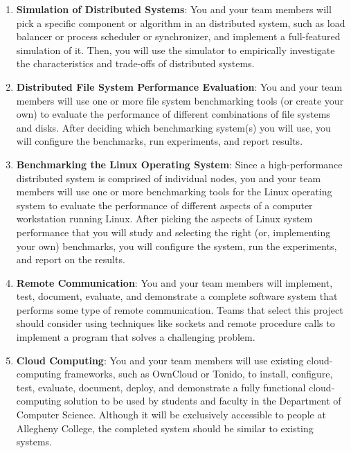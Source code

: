 \begin{enumerate}

  \item {\bf Simulation of Distributed Systems}: You and your team members will pick a specific component or algorithm
    in an distributed system, such as load balancer or process scheduler or synchronizer, and implement a full-featured
    simulation of it.  Then, you will use the simulator to empirically investigate the characteristics and trade-offs of
    distributed systems.

  \item {\bf Distributed File System Performance Evaluation}: You and your team members will use one or more file system
    benchmarking tools (or create your own) to evaluate the performance of different combinations of file systems and
    disks.  After deciding which benchmarking system(s) you will use, you will configure the benchmarks, run
    experiments, and report results.

  \item {\bf Benchmarking the Linux Operating System}: Since a high-performance distributed system is comprised of
    individual nodes, you and your team members will use one or more benchmarking tools for the Linux operating system
    to evaluate the performance of different aspects of a computer workstation running Linux.  After picking the aspects
    of Linux system performance that you will study and selecting the right (or, implementing your own) benchmarks, you
    will configure the system, run the experiments, and report on the results.

  \item {\bf Remote Communication}: You and your team members will implement, test, document, evaluate, and
    demonstrate a complete software system that performs some type of remote communication.  Teams that select this
    project should consider using techniques like sockets and remote procedure calls to implement a program that solves
    a challenging problem.

  \item {\bf Cloud Computing}: You and your team members will use existing cloud-computing frameworks, such as OwnCloud
    or Tonido, to install, configure, test, evaluate, document, deploy, and demonstrate a fully functional
    cloud-computing solution to be used by students and faculty in the Department of Computer Science. Although it will
    be exclusively accessible to people at Allegheny College, the completed system should be similar to existing
    systems.


\end{enumerate}
